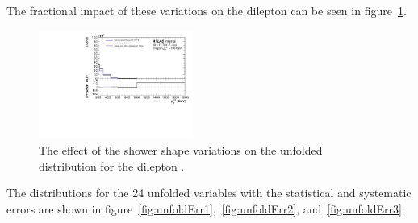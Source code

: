 The fractional impact of these variations on the dilepton \pt can be seen in figure~\ref{fig:showerSystErr}.

\begin{figure}[h!]
  \centering
  \includegraphics[page=40,width=0.45\textwidth]{figures/IBUPlots.pdf}
  \caption{The effect of the shower shape variations on the unfolded distribution for the dilepton \pt.}
  \label{fig:showerSystErr}
\end{figure}

The distributions for the 24 unfolded variables with the statistical and systematic errors are shown in figure~\ref{fig:unfoldErr1},~\ref{fig:unfoldErr2}, and~\ref{fig:unfoldErr3}.

